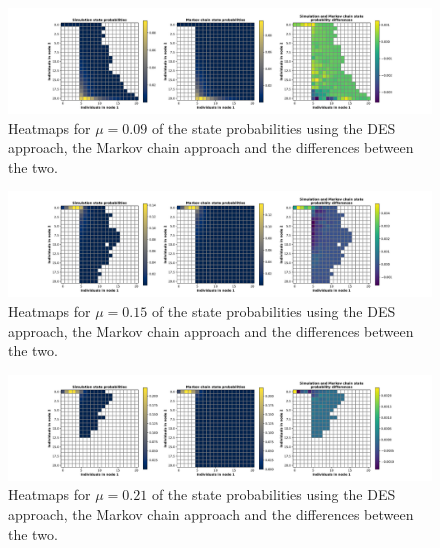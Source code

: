 \begin{figure}[H]
    \includegraphics[width=\textwidth, trim=100 10 100 10, clip]{chapters/03_queueing_model/img/numeric_results_and_timings/steady_state_probabilities/main_3.pdf}
    \caption{Heatmaps for \(\mu = 0.09\) of the state probabilities using the
    DES approach, the Markov chain approach and the differences between the
    two.}
    \label{fig:comparison_steady_state_probabilities_2}
\end{figure}

\begin{figure}[H]
    \includegraphics[width=\textwidth, trim=100 10 100 10, clip]{chapters/03_queueing_model/img/numeric_results_and_timings/steady_state_probabilities/main_5.pdf}
    \caption{Heatmaps for \(\mu = 0.15\) of the state probabilities using the
    DES approach, the Markov chain approach and the differences between the
    two.}
    \label{fig:comparison_steady_state_probabilities_3}
\end{figure}

\begin{figure}[H]
    \includegraphics[width=\textwidth, trim=100 10 100 10, clip]{chapters/03_queueing_model/img/numeric_results_and_timings/steady_state_probabilities/main_7.pdf}
    \caption{Heatmaps for \(\mu = 0.21\) of the state probabilities using the
    DES approach, the Markov chain approach and the differences between the
    two.}
    \label{fig:comparison_steady_state_probabilities_4}
\end{figure}

